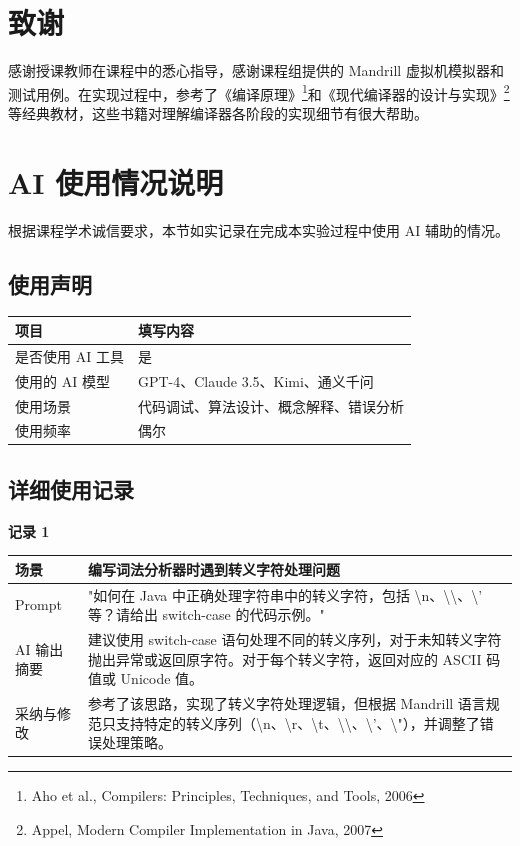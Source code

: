 \documentclass[12pt,hyperref,a4paper,UTF8]{ctexart}
\begin{document}
\section*{致谢}

感谢授课教师在课程中的悉心指导，感谢课程组提供的 Mandrill 虚拟机模拟器和测试用例。在实现过程中，参考了《编译原理》\footnote{Aho et al., Compilers: Principles, Techniques, and Tools, 2006}和《现代编译器的设计与实现》\footnote{Appel, Modern Compiler Implementation in Java, 2007}等经典教材，这些书籍对理解编译器各阶段的实现细节有很大帮助。

\newpage
\appendix
\section{AI 使用情况说明}

根据课程学术诚信要求，本节如实记录在完成本实验过程中使用 AI 辅助的情况。

\subsection{使用声明}

\begin{table}[!htbp]
    \centering
    \begin{tabular}{|p{4cm}|p{9cm}|}
    \hline
    \textbf{项目} & \textbf{填写内容} \\
    \hline
    是否使用 AI 工具 & 是 \\
    \hline
    使用的 AI 模型 & GPT-4、Claude 3.5、Kimi、通义千问 \\
    \hline
    使用场景 & 代码调试、算法设计、概念解释、错误分析 \\
    \hline
    使用频率 & 偶尔 \\
    \hline
    \end{tabular}
\end{table}

\subsection{详细使用记录}

\textbf{记录 1}

\begin{tabular}{|p{3cm}|p{10cm}|}
\hline
场景 & 编写词法分析器时遇到转义字符处理问题 \\ \hline
Prompt & "如何在 Java 中正确处理字符串中的转义字符，包括 \textbackslash n、\textbackslash\textbackslash、\textbackslash' 等？请给出 switch-case 的代码示例。" \\ \hline
AI 输出摘要 & 建议使用 switch-case 语句处理不同的转义序列，对于未知转义字符抛出异常或返回原字符。对于每个转义字符，返回对应的 ASCII 码值或 Unicode 值。 \\ \hline
采纳与修改 & 参考了该思路，实现了转义字符处理逻辑，但根据 Mandrill 语言规范只支持特定的转义序列（\textbackslash n、\textbackslash r、\textbackslash t、\textbackslash \textbackslash、\textbackslash '、\textbackslash "），并调整了错误处理策略。 \\ \hline
\end{tabular}
\end{document}
